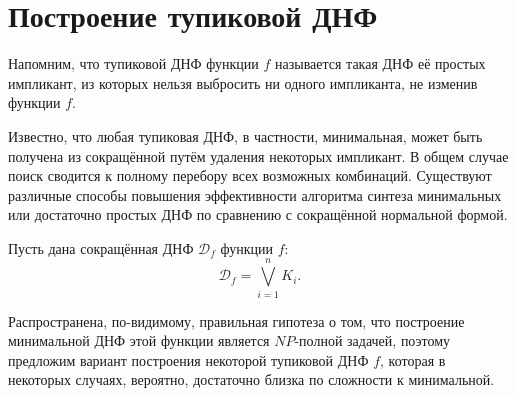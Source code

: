 \documentclass[12pt,a4paper,oneside,fleqn,leqno]{article}
\theoremstyle{definition}
\begin{document}
	\section{Построение тупиковой ДНФ}
		Напомним, что тупиковой ДНФ функции $f$ называется такая ДНФ её простых импликант, из которых нельзя выбросить ни одного импликанта, не изменив функции $f$.\par
		Известно, что любая тупиковая ДНФ, в частности, минимальная, может быть получена из сокращённой путём удаления некоторых импликант. В общем случае поиск сводится к полному перебору всех возможных комбинаций. Существуют различные способы повышения эффективности алгоритма синтеза минимальных или достаточно простых ДНФ по сравнению с сокращённой нормальной формой.\par
		Пусть дана сокращённая ДНФ $\mathcal{D}_{f}$ функции $f$:
		$$
			\mathcal{D}_{f} = \bigvee_{i = 1}^{n} K_{i}.
		$$ \par
		Распространена, по-видимому, правильная гипотеза о том, что построение минимальной ДНФ этой функции является $NP$-полной задачей, поэтому предложим вариант построения некоторой тупиковой ДНФ $f$, которая в некоторых случаях, вероятно, достаточно близка по сложности к минимальной.
\end{document}
